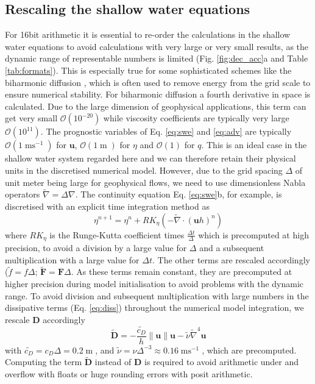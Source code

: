 \documentclass[draft]{agujournal2019}
\newcommand{\op}{\operatorname}
\begin{document}
\subsection{Rescaling the shallow water equations}
\label{sec:swm_rescale}

For 16bit arithmetic it is essential to re-order the calculations in the shallow water equations to avoid calculations with very large or very small results, as the dynamic range of representable numbers is limited (Fig. \ref{fig:dec_acc}a and Table \ref{tab:formats}). This is especially true for some sophisticated schemes like the biharmonic diffusion \cite{Griffies2000}, which is often used to remove energy from the grid scale to ensure numerical stability. For biharmonic diffusion a fourth derivative in space is calculated. Due to the large dimension of geophysical applications, this term can get very small $\mathcal{O}(10^{-20})$ while viscosity coefficients are typically very large $\mathcal{O}(10^{11})$. The prognostic variables of Eq. \ref{eq:swe} and \ref{eq:adv} are typically $\mathcal{O}(1\op{ms}^{-1})$ for $\mathbf{u}$, $\mathcal{O}(1\op{m})$ for $\eta$ and $\mathcal{O}(1)$ for $q$. This is an ideal case in the shallow water system regarded here and we can therefore retain their physical units in the discretised numerical model. However, due to the grid spacing $\Delta$ of unit meter being large for geophysical flows, we need to use dimensionless Nabla operators $\tilde{\nabla} = \Delta\nabla$. The continuity equation Eq. \ref{eq:swe}b, for example, is discretised with an explicit time integration method as
\begin{equation}
\eta^{n+1} = \eta^n + RK_{\eta}\left( - \tilde{\nabla} \cdot (\mathbf{u}h)^n\right)
\label{eq:discr}
\end{equation}
where $RK_\eta$ is the Runge-Kutta coefficient times $\tfrac{\Delta t}{\Delta}$ which is precomputed at high precision, to avoid a division by a large value for $\Delta$ and a subsequent multiplication with a large value for $\Delta t$. The other terms are rescaled accordingly ($\tilde{f} = f\Delta$; $\tilde{\mathbf{F}} = \mathbf{F}\Delta$. As these terms remain constant, they are precomputed at higher precision during model initialisation to avoid problems with the dynamic range. To avoid division and subsequent multiplication with large numbers in the dissipative terms (Eq. \ref{eq:diss}) throughout the numerical model integration, we rescale $\mathbf{D}$  accordingly
\begin{equation}
\tilde{\mathbf{D}} =-\frac{\tilde{c_D}}{h}\| \mathbf{u} \| \mathbf{u} - \tilde{\nu}\tilde{\nabla}^4\mathbf{u}
\end{equation}
with $\tilde{c_D} = c_D\Delta = 0.2\op{m}$,  and $\tilde{\nu} = \nu\Delta^{-3} \approx 0.16\op{ms}^{-1}$, which are precomputed. Computing the term $\tilde{\mathbf{D}}$ instead of $\mathbf{D}$ is required to avoid arithmetic under and overflow with floats or huge rounding errors with posit arithmetic. 
\end{document}
